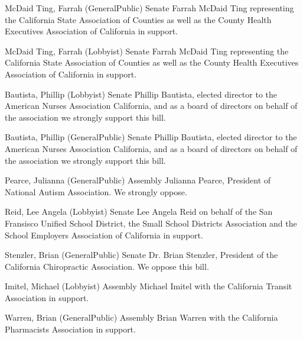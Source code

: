 \begin{result}{4.921907668723156}{McDaid Ting, Farrah (GeneralPublic) Senate}
Farrah McDaid Ting representing the California State Association of Counties as well as the County Health Executives Association of California in support.
\end{result}

\begin{result}{4.921907668723156}{McDaid Ting, Farrah (Lobbyist) Senate}
Farrah McDaid Ting representing the California State Association of Counties as well as the County Health Executives Association of California in support.
\end{result}

\begin{result}{4.902710968633834}{Bautista, Phillip (Lobbyist) Senate}
Phillip Bautista, elected director to the American Nurses Association California, and as a board of directors on behalf of the association we strongly support this bill.
\end{result}

\begin{result}{4.902710968633834}{Bautista, Phillip (GeneralPublic) Senate}
Phillip Bautista, elected director to the American Nurses Association California, and as a board of directors on behalf of the association we strongly support this bill.
\end{result}

\begin{result}{4.812498461251444}{Pearce, Julianna (GeneralPublic) Assembly}
Julianna Pearce, President of National Autism Association. We strongly oppose.
\end{result}

\begin{result}{4.792419477674715}{Reid, Lee Angela (Lobbyist) Senate}
Lee Angela Reid on behalf of the San Fransisco Unified School District, the Small School Districts Association and the School Employers Association of California in support.
\end{result}

\begin{result}{4.718879670218847}{Stenzler, Brian (GeneralPublic) Senate}
Dr. Brian Stenzler, President of the California Chiropractic Association. We oppose this bill.
\end{result}

\begin{result}{4.663139449522017}{Imitel, Michael (Lobbyist) Assembly}
Michael Imitel with the California Transit Association in support.
\end{result}

\begin{result}{4.638143430588506}{Warren, Brian (GeneralPublic) Assembly}
Brian Warren with the California Pharmacists Association in support.
\end{result}


